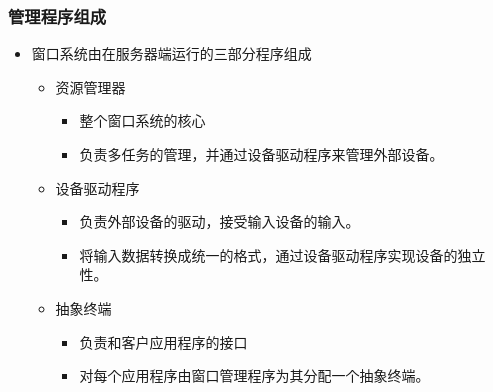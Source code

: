 \documentclass{beamer}
\begin{document}
\begin{frame}
	\frametitle{管理程序组成}
	\beamertemplatetransparentcovereddynamicmedium
	\begin{itemize}
		\item 窗口系统由在服务器端运行的三部分程序组成
		\pause
		\begin{itemize}
			\item 资源管理器
			\begin{itemize}
				\item 整个窗口系统的核心
				\item 负责多任务的管理，并通过设备驱动程序来管理外部设备。
			\end{itemize}
			\pause
			\item 设备驱动程序
			\begin{itemize}
				\item 负责外部设备的驱动，接受输入设备的输入。
				\item 将输入数据转换成统一的格式，通过设备驱动程序实现设备的独立性。
			\end{itemize}
			\pause
			\item 抽象终端
			\begin{itemize}
				\item 负责和客户应用程序的接口
				\item 对每个应用程序由窗口管理程序为其分配一个抽象终端。
			\end{itemize}
		\end{itemize}
	\end{itemize}
\end{frame}
\end{document}
